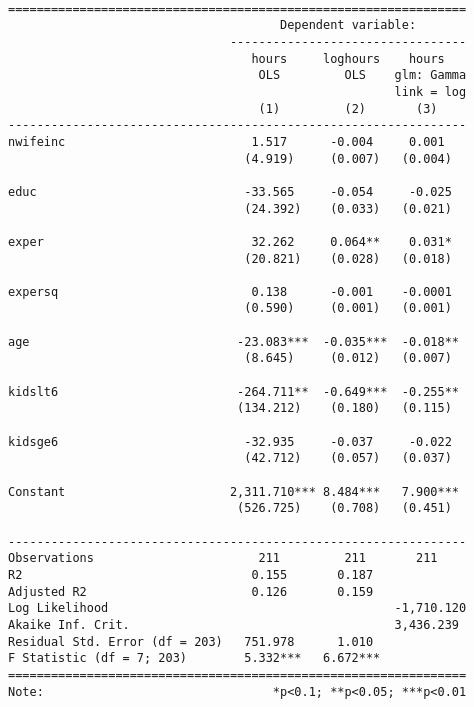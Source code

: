 \documentclass[
  letterpaper,
  DIV=11,
  numbers=noendperiod]{scrreprt}
\begin{document}
\begin{verbatim}

================================================================
                                      Dependent variable:       
                               ---------------------------------
                                  hours     loghours    hours   
                                   OLS         OLS    glm: Gamma
                                                      link = log
                                   (1)         (2)       (3)    
----------------------------------------------------------------
nwifeinc                          1.517      -0.004     0.001   
                                 (4.919)     (0.007)   (0.004)  
                                                                
educ                             -33.565     -0.054     -0.025  
                                 (24.392)    (0.033)   (0.021)  
                                                                
exper                             32.262     0.064**    0.031*  
                                 (20.821)    (0.028)   (0.018)  
                                                                
expersq                           0.138      -0.001    -0.0001  
                                 (0.590)     (0.001)   (0.001)  
                                                                
age                             -23.083***  -0.035***  -0.018** 
                                 (8.645)     (0.012)   (0.007)  
                                                                
kidslt6                         -264.711**  -0.649***  -0.255** 
                                (134.212)    (0.180)   (0.115)  
                                                                
kidsge6                          -32.935     -0.037     -0.022  
                                 (42.712)    (0.057)   (0.037)  
                                                                
Constant                       2,311.710*** 8.484***   7.900*** 
                                (526.725)    (0.708)   (0.451)  
                                                                
----------------------------------------------------------------
Observations                       211         211       211    
R2                                0.155       0.187             
Adjusted R2                       0.126       0.159             
Log Likelihood                                        -1,710.120
Akaike Inf. Crit.                                     3,436.239 
Residual Std. Error (df = 203)   751.978      1.010             
F Statistic (df = 7; 203)        5.332***   6.672***            
================================================================
Note:                                *p<0.1; **p<0.05; ***p<0.01
\end{verbatim}
\end{document}
